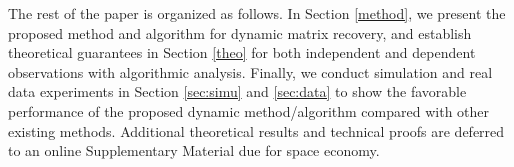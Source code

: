 \documentclass[12pt]{article}
\begin{document}
  The rest of the paper is organized as follows. In Section \ref{method}, we present the proposed method and algorithm for dynamic matrix recovery, and establish theoretical guarantees in Section \ref{theo} for both independent and dependent observations with algorithmic analysis. 
  Finally, we conduct simulation and real data experiments in Section \ref{sec:simu} and \ref{sec:data} to show the favorable performance of the proposed dynamic method/algorithm compared with other existing methods. %
  Additional theoretical results and technical proofs are deferred to an online Supplementary Material due for space economy.

  






  
\end{document}
